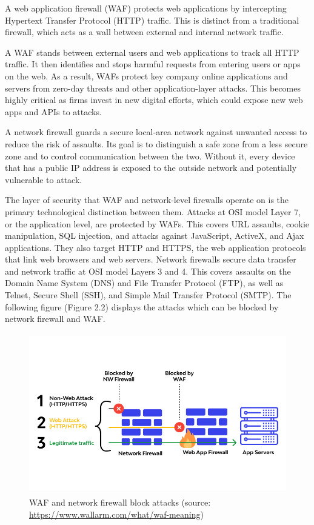 A web application firewall (WAF) protects web applications by intercepting Hypertext Transfer Protocol (HTTP) traffic. This is distinct from a traditional firewall, which acts as a wall between external and internal network traffic.

A WAF stands between external users and web applications to track all HTTP traffic. It then identifies and stops harmful requests from entering users or apps on the web. As a result, WAFs protect key company online applications and servers from zero-day threats and other application-layer attacks. This becomes highly critical as firms invest in new digital efforts, which could expose new web apps and APIs to attacks.

A network firewall guards a secure local-area network against unwanted access to reduce the risk of assaults. Its goal is to distinguish a safe zone from a less secure zone and to control communication between the two. Without it, every device that has a public IP address is exposed to the outside network and potentially vulnerable to attack.

The layer of security that WAF and network-level firewalls operate on is the primary technological distinction between them. Attacks at OSI model Layer 7, or the application level, are protected by WAFs. This covers URL assaults, cookie manipulation, SQL injection, and attacks against JavaScript, ActiveX, and Ajax applications. They also target HTTP and HTTPS, the web application protocols that link web browsers and web servers. Network firewalls secure data transfer and network traffic at OSI model Layers 3 and 4. This covers assaults on the Domain Name System (DNS) and File Transfer Protocol (FTP), as well as Telnet, Secure Shell (SSH), and Simple Mail Transfer Protocol (SMTP). The following figure (Figure 2.2) displays the attacks which can be blocked by network firewall and WAF.
\begin{figure}[h!]
	\centering
	\includegraphics[width=\linewidth, height=7cm,keepaspectratio]{figures/waf3.png}
	\caption{WAF and network firewall block attacks (source: \url{https://www.wallarm.com/what/waf-meaning})}
\end{figure}
\newpage

